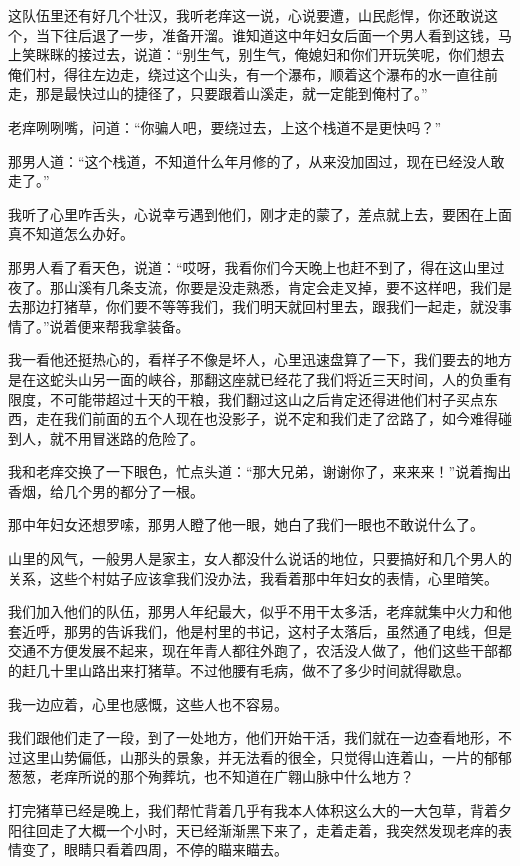 这队伍里还有好几个壮汉，我听老痒这一说，心说要遭，山民彪悍，你还敢说这个，当下往后退了一步，准备开溜。谁知道这中年妇女后面一个男人看到这钱，马上笑眯眯的接过去，说道：“别生气，别生气，俺媳妇和你们开玩笑呢，你们想去俺们村，得往左边走，绕过这个山头，有一个瀑布，顺着这个瀑布的水一直往前走，那是最快过山的捷径了，只要跟着山溪走，就一定能到俺村了。”

老痒咧咧嘴，问道：“你骗人吧，要绕过去，上这个栈道不是更快吗？”

那男人道：“这个栈道，不知道什么年月修的了，从来没加固过，现在已经没人敢走了。”

我听了心里咋舌头，心说幸亏遇到他们，刚才走的蒙了，差点就上去，要困在上面真不知道怎么办好。

那男人看了看天色，说道：“哎呀，我看你们今天晚上也赶不到了，得在这山里过夜了。那山溪有几条支流，你要是没走熟悉，肯定会走叉掉，要不这样吧，我们是去那边打猪草，你们要不等等我们，我们明天就回村里去，跟我们一起走，就没事情了。”说着便来帮我拿装备。

我一看他还挺热心的，看样子不像是坏人，心里迅速盘算了一下，我们要去的地方是在这蛇头山另一面的峡谷，那翻这座就已经花了我们将近三天时间，人的负重有限度，不可能带超过十天的干粮，我们翻过这山之后肯定还得进他们村子买点东西，走在我们前面的五个人现在也没影子，说不定和我们走了岔路了，如今难得碰到人，就不用冒迷路的危险了。

我和老痒交换了一下眼色，忙点头道：“那大兄弟，谢谢你了，来来来！”说着掏出香烟，给几个男的都分了一根。

那中年妇女还想罗嗦，那男人瞪了他一眼，她白了我们一眼也不敢说什么了。

山里的风气，一般男人是家主，女人都没什么说话的地位，只要搞好和几个男人的关系，这些个村姑子应该拿我们没办法，我看着那中年妇女的表情，心里暗笑。

我们加入他们的队伍，那男人年纪最大，似乎不用干太多活，老痒就集中火力和他套近呼，那男的告诉我们，他是村里的书记，这村子太落后，虽然通了电线，但是交通不方便发展不起来，现在年青人都往外跑了，农活没人做了，他们这些干部都的赶几十里山路出来打猪草。不过他腰有毛病，做不了多少时间就得歇息。

我一边应着，心里也感慨，这些人也不容易。

我们跟他们走了一段，到了一处地方，他们开始干活，我们就在一边查看地形，不过这里山势偏低，山那头的景象，并无法看的很全，只觉得山连着山，一片的郁郁葱葱，老痒所说的那个殉葬坑，也不知道在广翱山脉中什么地方？

打完猪草已经是晚上，我们帮忙背着几乎有我本人体积这么大的一大包草，背着夕阳往回走了大概一个小时，天已经渐渐黑下来了，走着走着，我突然发现老痒的表情变了，眼睛只看着四周，不停的瞄来瞄去。

